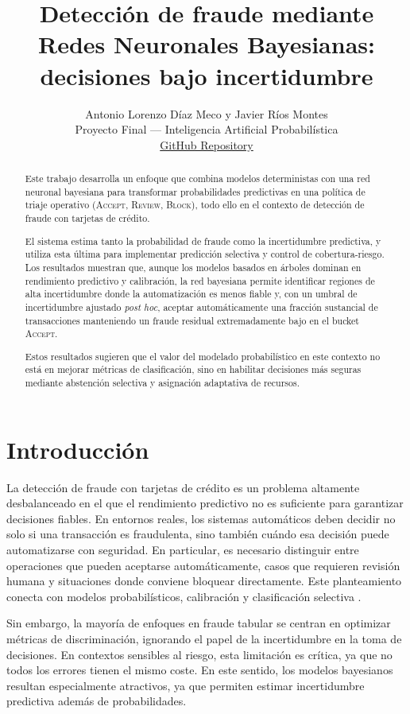 \documentclass{article}
\title{Detección de fraude mediante Redes Neuronales Bayesianas: decisiones bajo incertidumbre}
\author{
Antonio Lorenzo Díaz Meco y Javier Ríos Montes \\
Proyecto Final --- Inteligencia Artificial Probabilística \\
\href{https://github.com/AntonioLDM17/Bayesian-Fraud-Detection}{GitHub Repository}
}
\begin{document}
\maketitle

\begin{abstract}
    Este trabajo desarrolla un enfoque que combina modelos deterministas con una red neuronal bayesiana para transformar probabilidades predictivas en una política de triaje operativo (\textsc{Accept}, \textsc{Review}, \textsc{Block}), todo ello en el contexto de detección de fraude con tarjetas de crédito.

    El sistema estima tanto la probabilidad de fraude como la incertidumbre predictiva, y utiliza esta última para implementar predicción selectiva y control de cobertura-riesgo. Los resultados muestran que, aunque los modelos basados en árboles dominan en rendimiento predictivo y calibración, la red bayesiana permite identificar regiones de alta incertidumbre donde la automatización es menos fiable y, con un umbral de incertidumbre ajustado \emph{post hoc}, aceptar automáticamente una fracción sustancial de transacciones manteniendo un fraude residual extremadamente bajo en el bucket \textsc{Accept}.

    Estos resultados sugieren que el valor del modelado probabilístico en este contexto no está en mejorar métricas de clasificación, sino en habilitar decisiones más seguras mediante abstención selectiva y asignación adaptativa de recursos.
\end{abstract}

\section{Introducción}

La detección de fraude con tarjetas de crédito es un problema altamente desbalanceado en el que el rendimiento predictivo no es suficiente para garantizar decisiones fiables. En entornos reales, los sistemas automáticos deben decidir no solo si una transacción es fraudulenta, sino también cuándo esa decisión puede automatizarse con seguridad. En particular, es necesario distinguir entre operaciones que pueden aceptarse automáticamente, casos que requieren revisión humana y situaciones donde conviene bloquear directamente. Este planteamiento conecta con modelos probabilísticos, calibración y clasificación selectiva \citep{elyaniv2010,niculescu2005,guo2017}.

Sin embargo, la mayoría de enfoques en fraude tabular se centran en optimizar métricas de discriminación, ignorando el papel de la incertidumbre en la toma de decisiones. En contextos sensibles al riesgo, esta limitación es crítica, ya que no todos los errores tienen el mismo coste. En este sentido, los modelos bayesianos resultan especialmente atractivos, ya que permiten estimar incertidumbre predictiva además de probabilidades.
\end{document}
